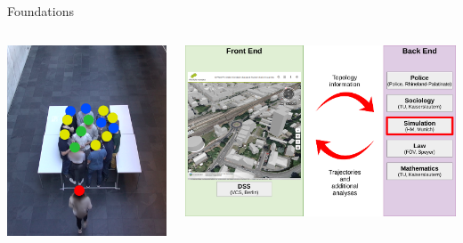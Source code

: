 \documentclass[compress,t,usenames,xcolor=dvipsnames]{beamer}
\begin{document}
\begin{frame}{Foundations}
\begin{columns}
    \end{columns}
    \vspace{-0.30\baselineskip}
    \begin{columns}
        \begin{column}[t]{0.36\textwidth}
            \centering
            \href{run:./Videos/Experiment.mp4}{\includegraphics[height=0.30\textheight]{Psychology/ExperimentDenseCrowd/Experiment-DenseCrowd-VideoFootage-Modified}}
        \end{column}
        \begin{column}[t]{0.40\textwidth}
            \centering
            \includegraphics[height=0.30\textheight]{Psychology/DSSInteraction/DSS-Interaction-BackEnd2}

\end{column}
\end{columns}
\end{frame}
\end{document}
